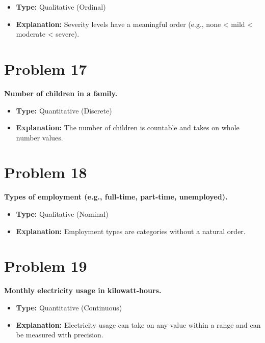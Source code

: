 \documentclass[
  letterpaper,
  DIV=11,
  numbers=noendperiod]{scrreprt}
\begin{document}
\begin{itemize}
\item
  \textbf{Type:} Qualitative (Ordinal)
\item
  \textbf{Explanation:} Severity levels have a meaningful order (e.g.,
  none \textless{} mild \textless{} moderate \textless{} severe).
\end{itemize}

\section*{Problem 17}\label{problem-17-2}


\textbf{Number of children in a family.}

\begin{itemize}
\item
  \textbf{Type:} Quantitative (Discrete)
\item
  \textbf{Explanation:} The number of children is countable and takes on
  whole number values.
\end{itemize}

\section*{Problem 18}\label{problem-18-1}


\textbf{Types of employment (e.g., full-time, part-time, unemployed).}

\begin{itemize}
\item
  \textbf{Type:} Qualitative (Nominal)
\item
  \textbf{Explanation:} Employment types are categories without a
  natural order.
\end{itemize}

\section*{Problem 19}\label{problem-19-1}


\textbf{Monthly electricity usage in kilowatt-hours.}

\begin{itemize}
\item
  \textbf{Type:} Quantitative (Continuous)
\item
  \textbf{Explanation:} Electricity usage can take on any value within a
  range and can be measured with precision.
\end{itemize}
\end{document}
